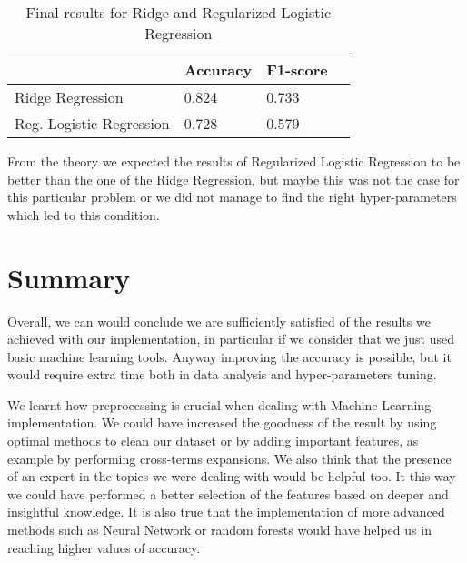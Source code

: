 \documentclass[10pt,article]{IEEEtran}
\begin{document}
\begin{table}[!h]
\centering
\label{tab:finalresults}
\begin{tabular}{l|l|l|l}
\cline{2-3}
                                                 & Accuracy & F1-score          \\ 
\hline
\multicolumn{1}{|l|}{Ridge Regression}                     & 0.824     & 0.733             \\ 
\cline{1-1}
\multicolumn{1}{|l|}{Reg. Logistic Regression}  & 0.728          & 0.579                 \\
\hline
\end{tabular}
\caption{Final results for Ridge and Regularized Logistic Regression }
\vspace{-0.5cm}
\end{table}

From the theory we expected the results of Regularized Logistic Regression to be better than the one of the Ridge Regression, but maybe this was not the case for this particular problem or we did not manage to find the right hyper-parameters which led to this condition.


\section{Summary}

Overall, we can would conclude we are sufficiently satisfied of the results we achieved with our implementation, in particular if we consider that we just used basic machine learning tools. Anyway improving the accuracy is possible, but it would require extra time both in data analysis and hyper-parameters tuning. 

We learnt how preprocessing is crucial when dealing with Machine Learning implementation. We could have increased the goodness of the result by using optimal methods to clean our dataset or by adding important features, as example by performing cross-terms expansions. We also think that the presence of an expert in the topics we were dealing with would be helpful too. It this way we could have performed a better selection of the features based on deeper and insightful knowledge. It is also true that the implementation of more advanced methods such as Neural Network or random forests would have helped us in reaching higher values of accuracy.




\end{document}
